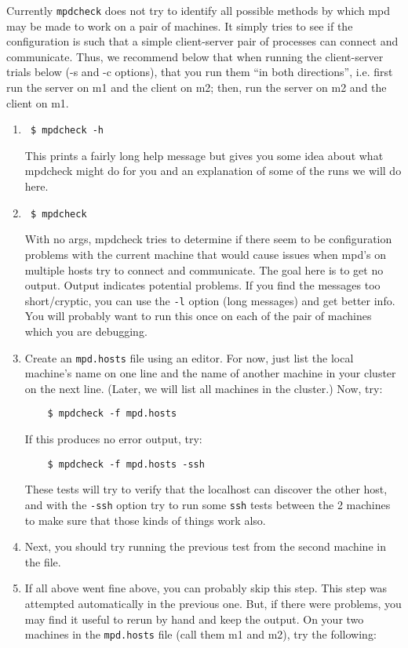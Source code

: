 \documentclass[dvipdfm,11pt]{article}
\begin{document}
Currently \texttt{mpdcheck} does not try to identify all possible methods
by which mpd may be made to work on a pair of machines.  It simply tries
to see if the configuration is such that a simple client-server pair
of processes can connect and communicate.  Thus, we recommend below
that when running the client-server trials below (-s and -c options),
that you run them ``in both directions'', i.e. first run the server on m1
and the client on m2; then, run the server on m2 and the client on m1.

\begin{enumerate}
\item \verb+ $ mpdcheck -h +

This prints a fairly long help message but gives you some
idea about what mpdcheck might do for you and an
explanation of some of the runs we will do here.

\item \verb+ $ mpdcheck +

With no args, mpdcheck tries to determine if there seem to
be configuration problems with the current machine that
would cause issues when mpd's on multiple hosts try to
connect and communicate.  The goal here is to get no
output.  Output indicates potential problems.  If you find
the messages too short/cryptic, you can use the \texttt{-l} option
(long messages) and get better info.  You will probably want to run
this once on each of the pair of machines which you are debugging.

\item Create an \texttt{mpd.hosts} file using an editor.  For now, just
    list the local machine's name on one line and the name of
    another machine in your cluster on the next line.  (Later,
    we will list all machines in the cluster.)  Now, try:
\begin{verbatim}
    $ mpdcheck -f mpd.hosts
\end{verbatim}
    If this produces no error output, try:
\begin{verbatim}
    $ mpdcheck -f mpd.hosts -ssh
\end{verbatim}
These tests will try to verify that the localhost can
discover the other host, and with the \texttt{-ssh} option try to
run some \texttt{ssh} tests between the 2 machines to make sure
that those kinds of things work also.

\item Next, you should try running
the previous test from the second machine in the file.

\item If all above went fine above, you can probably skip this step.
This step was attempted automatically in the previous one.  But,
if there were problems, you may find it useful to rerun by hand and
keep the output.  On your two machines in the \texttt{mpd.hosts}
file (call them m1 and m2), try the following:


\end{enumerate}
\end{document}

